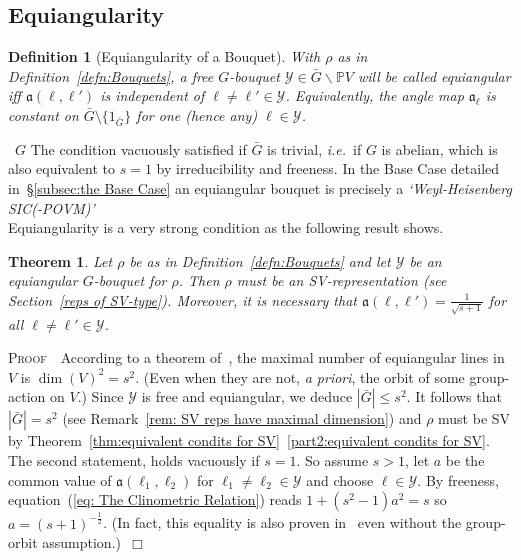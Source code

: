\documentclass[12pt]{article}
\newtheorem{defn}{Definition}[section]
\newtheorem{thm}{Theorem}[section]
\newcommand{\PVmodbarG}{\ensuremath{
\bar{G}\backslash \bbP V}}
\newcommand{\bbP}{\ensuremath{\mathbb{P}}}
\newcommand{\bPf}{\noindent \textsc{Proof\ }}
\newcommand{\cY}{\ensuremath{\mathcal{Y}}}
\newcommand{\ePf}{~$\Box$\vertsp\par}%
\newcommand{\fa}{\ensuremath{\mathfrak{a}}}
\newcommand{\ie}{{\em i.e.}}
\renewcommand{\rem}{\refstepcounter{rem}\noindent{\sc Remark \therem}}
\renewcommand{\therem}{\thesection.\arabic{rem}}
\newcommand{\vertsp}{\vspace{1ex}}
\newcommand{\barG}{\ensuremath{\bar{G}}}
\begin{document}
\subsection{Equiangularity} 
\begin{defn}[Equiangularity of a Bouquet]\label{def:equiangularity} With $\rho$ as in Definition~\ref{defn:Bouquets}, a \emph{free} $G$-bouquet $\cY\in\PVmodbarG$ will be called {\em equiangular} iff 
$\fa(\ell,\ell')$ is independent of $\ell\neq \ell'\in\cY$. Equivalently, the angle map $\fa_\ell$ is constant on $\bar{G}\setminus\{1_{\barG}\}$ for one (hence any) $\ell\in\cY$. 
\end{defn}
\rem\ $G$ The condition  vacuously satisfied if $\bar G$ is trivial, \ie\ if $G$ is abelian, which is also equivalent to $s=1$ by irreducibility and freeness. In the Base Case detailed in~\S\ref{subsec:the Base Case} an equiangular bouquet is precisely a \textit{`Weyl-Heisenberg SIC(-POVM)'}\bigskip\\
Equiangularity is a very strong condition as the following result shows.
\begin{thm}\label{thm:equiangular existence and clinometric}
	Let $\rho$ be as in Definition~\ref{defn:Bouquets} and let $\cY$ be an equiangular $G$-bouquet for $\rho$. Then 
$\rho$ must be an SV-representation (see Section~\ref{reps of SV-type}). Moreover, it is necessary that  
	$\fa(\ell,\ell')=\frac{1}{\sqrt{s+1}}$ for all 
	$\ell\neq \ell'\in\cY$. 
\end{thm}
\bPf\ According to a theorem of~\cite{Delsarte et al}, the maximal number of equiangular lines in $V$ is $\dim(V)^2=s^2$. (Even when they are not, \textit{a priori}, the orbit of some group-action on $V$.) Since $\cY$ is free and equiangular, we deduce $|\barG|\leq s^2$. It follows that  $|\barG|=s^2$ (see Remark~\ref{rem: SV reps have maximal dimension}) and $\rho$ must be SV by Theorem~\ref{thm:equivalent condits for SV}~\ref{part2:equivalent condits for SV}. The second statement, holds vacuously if $s=1$. So assume $s>1$, let $a$ be the common value of $\fa(\ell_1,\ell_2)$ for 
$\ell_1\neq\ell_2\in\cY$ and choose $\ell\in\cY$. By freeness, equation~(\ref{eq: The Clinometric Relation}) reads  $1+(s^2-1)a^2=s$ so $a=(s+1)^{-\frac12}$. (In fact, this equality is also proven in~\cite{Delsarte et al} even without the group-orbit assumption.)\ePf
\end{document}
